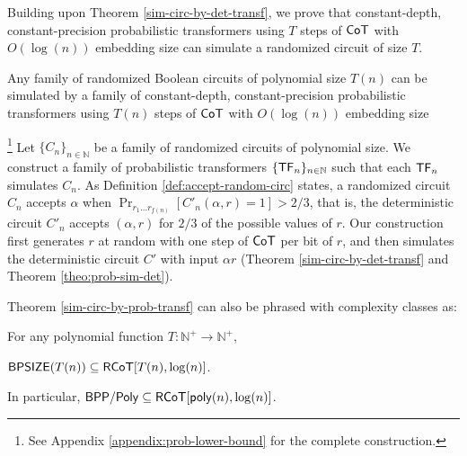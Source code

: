 Building upon Theorem \ref{sim-circ-by-det-transf}, we prove that constant-depth, constant-precision probabilistic transformers using $T$ steps of $\mathsf{CoT}$ with $O(\log(n))$ embedding size can simulate a randomized circuit of size $T$.

\begin{theorem}\label{sim-circ-by-prob-transf}
    Any family of randomized Boolean circuits of polynomial size $T(n)$ can be simulated by a family of constant-depth, constant-precision probabilistic transformers using $T(n)$ steps of $\mathsf{CoT}$ with $O(\log(n))$ embedding size 
\end{theorem}

\begin{proofsketch}\footnote{See Appendix \ref{appendix:prob-lower-bound} for the complete construction.}
    Let $\{C_n\}_{n\in\mathbb{N}}$ be a family of randomized circuits of polynomial size.
    We construct a family of probabilistic transformers $\{\mathsf{TF}_n\}_{n \in \mathbb{N}}$ such that each $\mathsf{TF}_n$ simulates $C_n$.
    As Definition \ref{def:accept-random-circ} states, a randomized circuit $C_n$ accepts $\alpha$ when $\Pr_{r_1 \dots r_{f(n)}}[C'_n(\alpha, r) = 1] > 2/3$, that is, the deterministic circuit $C'_n$ accepts $(\alpha, r)$ for $2/3$ of the possible values of $r$.
    Our construction first generates $r$ at random with one step of $\mathsf{CoT}$ per bit of $r$, and then simulates the deterministic circuit $C'$ with input $\alpha r$ (Theorem \ref{sim-circ-by-det-transf} and Theorem \ref{theo:prob-sim-det}).
\end{proofsketch}


Theorem \ref{sim-circ-by-prob-transf} can also be phrased with complexity classes as:

\begin{theorem}\label{prob-lower-bound}
    For any polynomial function $T:\mathbb{N}^+\to \mathbb{N}^+$,

    $\mathsf{BPSIZE}(T(n)) \subseteq \mathsf{RCoT} [T(n), \log(n)]$.
    
    In particular, $\mathsf{BPP/Poly} \subseteq \mathsf{RCoT}[\mathsf{poly}(n), \log(n)]$.
\end{theorem}
